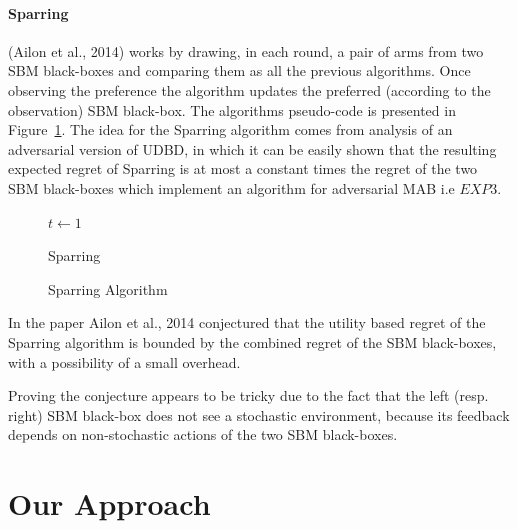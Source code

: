 \documentclass{llncs}
\begin{document}
\paragraph{Sparring}
	(Ailon et al., 2014) works by drawing, in each round, a pair of arms from two SBM black-boxes and comparing them as all the previous algorithms. 
	Once observing the preference the algorithm updates the preferred (according to the observation) SBM black-box. 
	The algorithms pseudo-code is presented in Figure~\ref{algo_Sparring}.
	The idea for the Sparring algorithm comes from analysis of an adversarial version of UDBD, in which it can be easily shown that the resulting expected regret of Sparring is at most a constant times the regret of the two SBM black-boxes which implement an algorithm for adversarial MAB i.e $EXP3$.
		
		\begin{figure}[h]
	\IncMargin{1em}
		\begin{algorithm}[H]
		\BlankLine
		$t\leftarrow 1$\\
			\caption{Sparring}
		\end{algorithm}
		\caption{Sparring Algorithm}\label{algo_Sparring}
	\end{figure}	
	
		
	\begin{conjecture}
 		In the paper Ailon et al., 2014 conjectured that the utility based regret of the Sparring algorithm is bounded by the combined regret of the SBM black-boxes, with a possibility of a small overhead.
 	\end{conjecture}	
 	Proving the conjecture appears to be tricky due to the fact
that the left (resp. right) SBM black-box does not see a stochastic environment, because its feedback depends on non-stochastic actions of the two SBM black-boxes. 
	
\section{Our Approach}	
	
\end{document}
